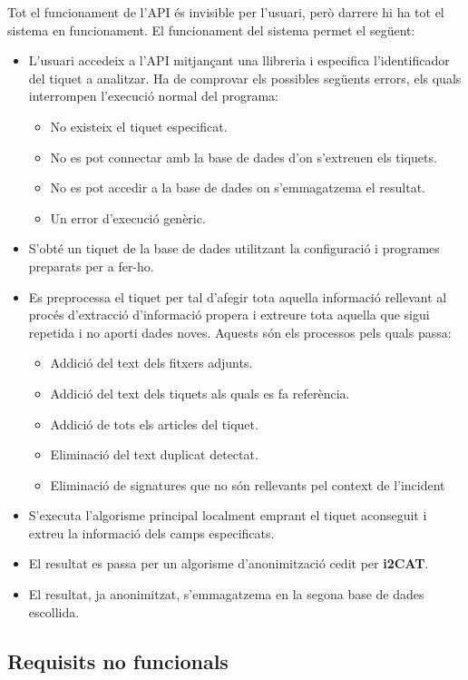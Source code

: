 Tot el funcionament de l'API és invisible per l'usuari, però darrere hi ha tot el sistema en funcionament. El funcionament del sistema permet el següent: 
\begin{itemize}
    \item L'usuari accedeix a l'API mitjançant una llibreria i especifica l'identificador del tiquet a analitzar. Ha de comprovar els possibles següents errors, els quals interrompen l'execució normal del programa:
    \begin{itemize}
        \item No existeix el tiquet especificat. 
        \item No es pot connectar amb la base de dades d'on s'extreuen els tiquets.
        \item No es pot accedir a la base de dades on s'emmagatzema el resultat.
        \item Un error d'execució genèric.
    \end{itemize}
    \item S'obté un tiquet de la base de dades utilitzant la configuració i programes preparats per a fer-ho.
    \item Es preprocessa el tiquet per tal d'afegir tota aquella informació rellevant al procés d'extracció d'informació propera i extreure tota aquella que sigui repetida i no aporti dades noves. Aquests són els processos pels quals passa:
    \begin{itemize}
        \item Addició del text dels fitxers adjunts.
        \item Addició del text dels tiquets als quals es fa referència.
        \item Addició de tots els articles del tiquet.
        \item Eliminació del text duplicat detectat.
        \item Eliminació de signatures que no són rellevants pel context de l'incident
    \end{itemize}
    \item S'executa l'algorisme principal localment emprant el tiquet aconseguit i extreu la informació dels camps especificats.
    \item El resultat es passa per un algorisme d'anonimització cedit per \textbf{i2CAT}.
    \item El resultat, ja anonimitzat, s'emmagatzema en la segona base de dades escollida.
\end{itemize}


\subsection{Requisits no funcionals} \label{ssec:abast-requisits-no-funcionals}

